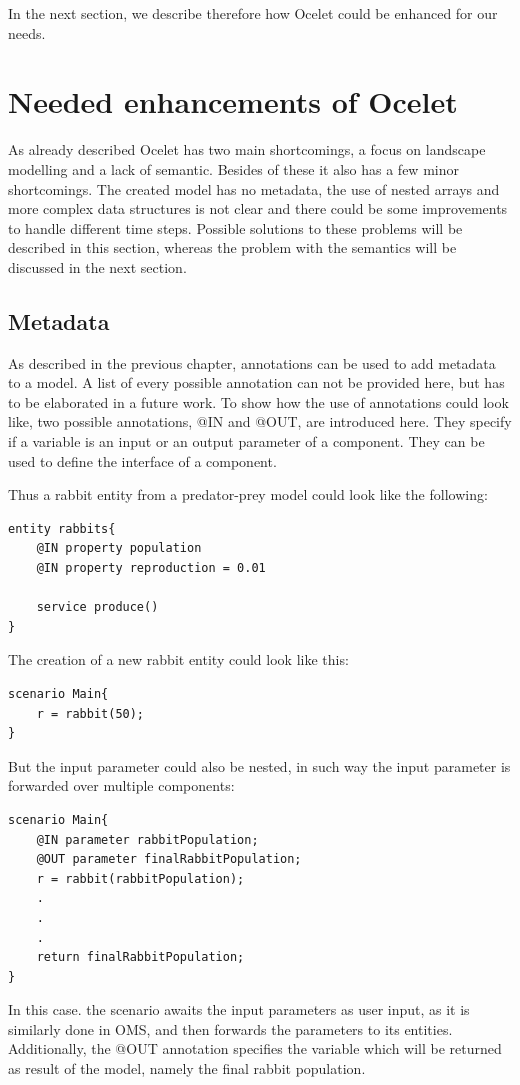 \par
In the next section, we describe therefore how Ocelet could be enhanced for our needs.

\section{Needed enhancements of Ocelet}
\par
As already described Ocelet has two main shortcomings, a focus on landscape modelling and a lack of semantic. Besides of these it also has a few minor shortcomings. The created model has no metadata, the use of nested arrays and more complex data structures is not clear and there could be some improvements to handle different time steps. Possible solutions to these problems will be described in this section, whereas the problem with the semantics will be discussed in the next section.
\subsection{Metadata}
\par
As described in the previous chapter, annotations can be used to add metadata to a model. A list of every possible annotation can not be provided here, but has to be elaborated in a future work. To show how the use of annotations could look like, two possible annotations, @IN and @OUT, are introduced here. They specify if a variable is an input or an output parameter of a component. They can be used to define the interface of a component.
\par
Thus a rabbit entity from a predator-prey model could look like the following:
\begin{lstlisting}[language=Ocelet]
entity rabbits{
    @IN property population
    @IN property reproduction = 0.01   

    service produce()
}
\end{lstlisting}
The creation of a new rabbit entity could look like this:
\begin{lstlisting}[language=Ocelet]
scenario Main{
    r = rabbit(50);
}
\end{lstlisting}
But the input parameter could also be nested, in such way the input parameter is forwarded over multiple components:
\begin{lstlisting}[language=Ocelet]
scenario Main{
    @IN parameter rabbitPopulation;
    @OUT parameter finalRabbitPopulation;
    r = rabbit(rabbitPopulation);
    .
    .
    .
    return finalRabbitPopulation;
}
\end{lstlisting}
\par
In this case. the scenario awaits the input parameters as user input, as it is similarly done in OMS, and then forwards the parameters to its entities. Additionally, the @OUT annotation specifies the variable which will be returned as result of the model, namely the final rabbit population.

